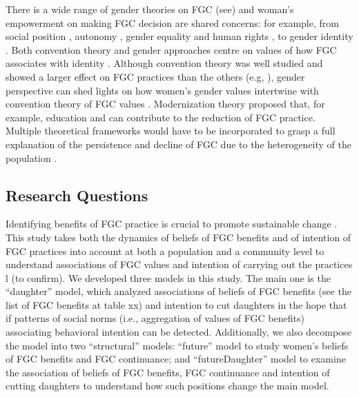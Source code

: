 \documentclass[12pt,]{article}
\begin{document}
{There is a wide range of gender theories on FGC (see\cite{Anti13, Hodg11, Lewi95}) and woman's empowerment on making FGC decision are shared concerns: for example, from social position \cite{VanMeek15}, autonomy \cite{Meye00}, gender equality and human rights \cite{Drol11}, to gender identity \cite{Youn04, Koom14, WintKoom09}. Both convention theory and gender approaches centre on values of how FGC associates with identity .  Although convention theory was well studied and showed a larger effect on FGC practices than the others (e.g, \cite{BoylMcMo02, BoylCorl10, FreyJohn07, FrieMahm13, Hayf05, KandMwek09, Mack96, Mack06, ReigGonz14, YirgKass12}), gender perspective can shed lights on how women’s gender values intertwine with convention theory of FGC values \cite{cites}.   Modernization theory proposed that, for example, education and \cite{BoylMcMo02, Youn02} can contribute to the reduction of FGC practice.  Multiple theoretical frameworks would have to be incorporated to grasp a full explanation of the persistence and decline of FGC due to the heterogeneity of the population \cite{Hayf05, EffeVogt15, ModrLiu13}.  

\subsection{Research Questions}\label{research-questions}

Identifying benefits of FGC practice is crucial to promote sustainable change \cite{EffeVogt15}.  This study takes both the dynamics of beliefs of FGC benefits and of intention of FGC practices into account at both a population and a community level to understand associations of FGC values and intention of carrying out the practices l \cite{BoylCorl010, Drol11,Hayf05, Grue05, Hodg11,KandNwak09, OdukAfol17} (to confirm).  We developed three models in this study.  The main one is the “daughter” model, which analyzed associations of beliefs of FGC benefits (see the list of FGC benefits at table xx) and intention to cut daughters in the hope that if patterns of social norms (i.e., aggregation of values of FGC benefits) associating behavioral intention can be detected.  Additionally, we also decompose the model into two “structural” models:  “future” model to study women’s beliefs of FGC benefits and FGC continuance; and “futureDaughter” model to examine the association of beliefs of FGC benefits, FGC continuance and intention of cutting daughters to understand how such positions change the main model.

}
\end{document}
